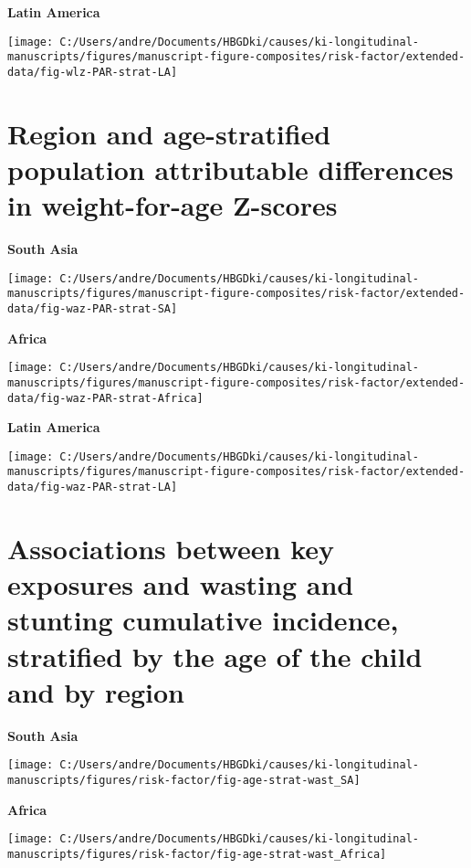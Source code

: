 \documentclass[
  9pt,
]{book}
\begin{document}
\textbf{Latin America}

\texttt{[image: C:/Users/andre/Documents/HBGDki/causes/ki-longitudinal-manuscripts/figures/manuscript-figure-composites/risk-factor/extended-data/fig-wlz-PAR-strat-LA]}

\hypertarget{region-and-age-stratified-population-attributable-differences-in-weight-for-age-z-scores}{%
\section{Region and age-stratified population attributable differences in weight-for-age Z-scores}\label{region-and-age-stratified-population-attributable-differences-in-weight-for-age-z-scores}}

\textbf{South Asia}

\texttt{[image: C:/Users/andre/Documents/HBGDki/causes/ki-longitudinal-manuscripts/figures/manuscript-figure-composites/risk-factor/extended-data/fig-waz-PAR-strat-SA]}

\textbf{Africa}

\texttt{[image: C:/Users/andre/Documents/HBGDki/causes/ki-longitudinal-manuscripts/figures/manuscript-figure-composites/risk-factor/extended-data/fig-waz-PAR-strat-Africa]}

\textbf{Latin America}

\texttt{[image: C:/Users/andre/Documents/HBGDki/causes/ki-longitudinal-manuscripts/figures/manuscript-figure-composites/risk-factor/extended-data/fig-waz-PAR-strat-LA]}

\hypertarget{associations-between-key-exposures-and-wasting-and-stunting-cumulative-incidence-stratified-by-the-age-of-the-child-and-by-region}{%
\section{Associations between key exposures and wasting and stunting cumulative incidence, stratified by the age of the child and by region}\label{associations-between-key-exposures-and-wasting-and-stunting-cumulative-incidence-stratified-by-the-age-of-the-child-and-by-region}}

\textbf{South Asia}

\texttt{[image: C:/Users/andre/Documents/HBGDki/causes/ki-longitudinal-manuscripts/figures/risk-factor/fig-age-strat-wast\_SA]}

\textbf{Africa}

\texttt{[image: C:/Users/andre/Documents/HBGDki/causes/ki-longitudinal-manuscripts/figures/risk-factor/fig-age-strat-wast\_Africa]}
\end{document}
